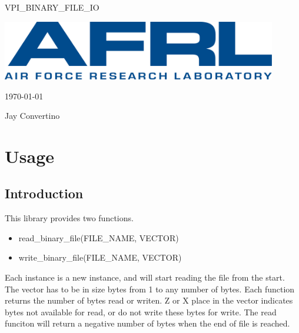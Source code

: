 \begin{titlepage}
  \begin{center}

  {\Huge VPI\_BINARY\_FILE\_IO}

  \vspace{25mm}

  \includegraphics[width=0.90\textwidth,height=\textheight,keepaspectratio]{img/AFRL.png}

  \vspace{25mm}

  \today

  \vspace{15mm}

  {\Large Jay Convertino}

  \end{center}
\end{titlepage}

\tableofcontents

\newpage

\section{Usage}

\subsection{Introduction}

\par
This library provides two functions.
\begin{itemize}
\item read\_binary\_file(FILE\_NAME, VECTOR)
\item write\_binary\_file(FILE\_NAME, VECTOR)
\end{itemize}
\par
Each instance is a new instance, and will start reading the file from the start.
The vector has to be in size bytes from 1 to any number of bytes. Each function
returns the number of bytes read or writen. Z or X place in the vector indicates
bytes not available for read, or do not write these bytes for write. The read funciton
will return a negative number of bytes when the end of file is reached.

